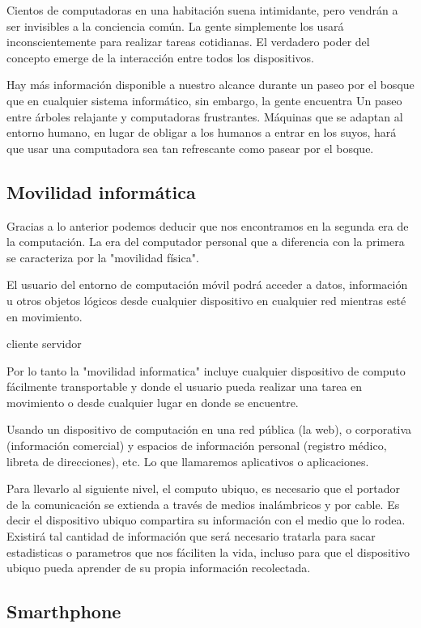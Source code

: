 Cientos de computadoras en una habitación suena intimidante, pero vendrán a ser invisibles a la conciencia común. La gente simplemente los usará inconscientemente para realizar tareas cotidianas.
El verdadero poder del concepto emerge de la interacción entre todos los dispositivos.

Hay más información disponible a nuestro alcance durante un paseo por el bosque que en cualquier sistema informático, sin embargo, la gente encuentra Un paseo entre árboles relajante y computadoras frustrantes. Máquinas que se adaptan al entorno humano, en lugar de obligar a los humanos a entrar en los suyos, hará que usar una computadora sea tan refrescante como pasear por el bosque.\cite{weiser}

\subsection{Movilidad inform\'atica}

Gracias a lo anterior podemos deducir que nos encontramos en la segunda era de la computación. La era del computador personal que a diferencia con la primera se caracteriza por la "movilidad física".

El usuario del entorno de computación móvil podrá acceder a datos, información u otros objetos lógicos desde cualquier dispositivo en cualquier red mientras esté en movimiento.\cite{asoke}

cliente servidor

Por lo tanto la "movilidad informatica" incluye cualquier dispositivo de computo fácilmente transportable y donde el usuario pueda realizar una tarea en movimiento o desde cualquier lugar en donde se encuentre. 

Usando un dispositivo de computación en una red pública (la web), o corporativa (información comercial) y espacios de información personal (registro médico, libreta de direcciones), etc. Lo que llamaremos aplicativos o aplicaciones.

Para llevarlo al siguiente nivel, el computo ubiquo, es necesario que el portador de la comunicación se extienda a través de medios inalámbricos y por cable. Es decir el dispositivo ubiquo compartira su información con el medio que lo rodea. Existirá tal cantidad de información que será necesario tratarla para sacar estadisticas o parametros que nos fáciliten la vida, incluso para que el dispositivo ubiquo pueda aprender de su propia información recolectada.

\subsection{Smarthphone}

